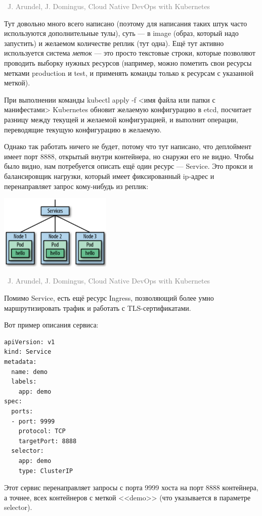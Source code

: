 \documentclass[a5paper]{article}
\newcommand{\attribution}[1] {
    \vspace{-5mm}\begin{flushright}\begin{scriptsize}\textcolor{gray}{\textcopyright\, #1}\end{scriptsize}\end{flushright}
}
\begin{document}
\attribution{J. Arundel, J. Domingus, Cloud Native DevOps with Kubernetes}

Тут довольно много всего написано (поэтому для написания таких штук часто используются дополнительные тулы), суть --- в image (образ, который надо запустить) и желаемом количестве реплик (тут одна). Ещё тут активно используется система \emph{меток} --- это просто текстовые строки, которые позволяют проводить выборку нужных ресурсов (например, можно пометить свои ресурсы метками production и test, и применять команды только к ресурсам с указанной меткой).

При выполнении команды kubectl apply -f <имя файла или папки с манифестами> Kubernetes обновит желаемую конфигурацию в etcd, посчитает разницу между текущей и желаемой конфигурацией, и выполнит операции, переводящие текущую конфигурацию в желаемую.

Однако так работать ничего не будет, потому что тут написано, что деплоймент имеет порт 8888, открытый внутри контейнера, но снаружи его не видно. Чтобы было видно, нам потребуется описать ещё один ресурс --- Service. Это прокси и балансировщик нагрузки, который имеет фиксированный ip-адрес и перенаправляет запрос кому-нибудь из реплик:

\begin{center}
    \includegraphics[width=0.4\textwidth]{kubernetesServices.png}
    \attribution{J. Arundel, J. Domingus, Cloud Native DevOps with Kubernetes}
\end{center}

Помимо Service, есть ещё ресурс Ingress, позволяющий более умно маршрутизировать трафик и работать с TLS-сертификатами.

Вот пример описания сервиса:

\begin{verbatim}
apiVersion: v1
kind: Service
metadata:
  name: demo
  labels:
    app: demo
spec:
  ports:
  - port: 9999
    protocol: TCP
    targetPort: 8888
  selector:
    app: demo
    type: ClusterIP
\end{verbatim}

Этот сервис перенаправляет запросы с порта 9999 хоста на порт 8888 контейнера, а точнее, всех контейнеров с меткой <<demo>> (что указывается в параметре selector).
\end{document}
